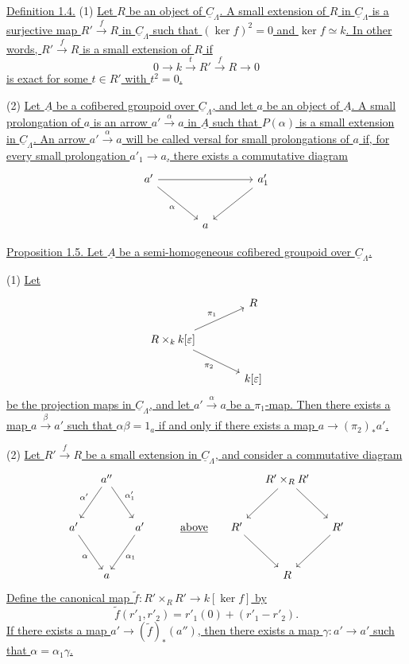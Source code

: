 
\underline{Definition 1.4.} (1) \underline{Let $R$ be an object of
$\underline C_\Lambda$. A small extension of $R$ in
$\underline C_\Lambda$ is a surjective map
$R'\xrightarrow{f}R$ in $\underline C_\Lambda$ such that
$(\ker f)^2=0$ and $\ker f\simeq k$. In other words,
$R'\xrightarrow{f}R$ is a small extension of $R$ if}
\[
0\longrightarrow k\xrightarrow{t}R'\xrightarrow{f}R
 \longrightarrow0
\]
\underline{is exact for some $t\in R'$ with $t^2=0$.}

(2) \underline{Let $\underline A$ be a cofibered groupoid over
$\underline C_\Lambda$, and let $a$ be an object of $\underline A$.
A small prolongation of $a$ is an arrow
$a'\xrightarrow{\alpha}a$ in $\underline A$ such that $P(\alpha)$ is
a small extension in $\underline C_\Lambda$. An arrow
$a'\xrightarrow{\alpha}a$ will be called versal for small
prolongations of $a$ if, for every small prolongation
$a'_1\longrightarrow a$, there exists a commutative diagram}
\[
\begin{tikzcd}[row sep=large,column sep=large]
a' \arrow[rr] \arrow[dr,"\alpha"'] & & a'_1 \arrow[dl] \\
& a &
\end{tikzcd}
\]

\underline{Proposition 1.5. Let $\underline A$ be a semi-homogeneous
cofibered groupoid over $\underline C_\Lambda$.}

(1) \underline{Let}
\[
\begin{tikzcd}[column sep=large]
& R \\
R\times_k k[\varepsilon]
 \arrow[ur,"\pi_1"] \arrow[dr,"\pi_2"'] & \\
& k[\varepsilon]
\end{tikzcd}
\]
\underline{be the projection maps in $\underline C_\Lambda$, and let
$a'\xrightarrow{\alpha}a$ be a $\pi_1$-map. Then there exists a map
$a\xrightarrow{\beta}a'$ such that $\alpha\beta=1_a$ if and only if
there exists a map $a\longrightarrow(\pi_2)_*a'$.}


(2) \underline{Let $R'\xrightarrow{f}R$ be a small extension in
$\underline C_\Lambda$, and consider a commutative diagram}
\[
\begin{tikzcd}[row sep=large,column sep=small]
& a'' \arrow[dl,"\alpha'"'] \arrow[dr,"\alpha'_1"]
  & & & & & R'\times_RR' \arrow[dl] \arrow[dr] & \\
a' \arrow[dr,"\alpha"'] & & a' \arrow[dl,"\alpha_1"]
  & & \underline{\text{above}} & R' \arrow[dr] & & R' \arrow[dl] \\
& a & & & & & R &
\end{tikzcd}
\]
\underline{Define the canonical map
$\widetilde f:R'\times_RR'\longrightarrow k[\ker f]$ by}
\[
 \widetilde f(r'_1,r'_2)=r'_1(0)+(r'_1-r'_2).
\]
\underline{If there exists a map
$a'\longrightarrow(\widetilde f)_*(a'')$, then there exists a map
$\gamma:a'\longrightarrow a'$ such that
$\alpha=\alpha_1\gamma$.}

